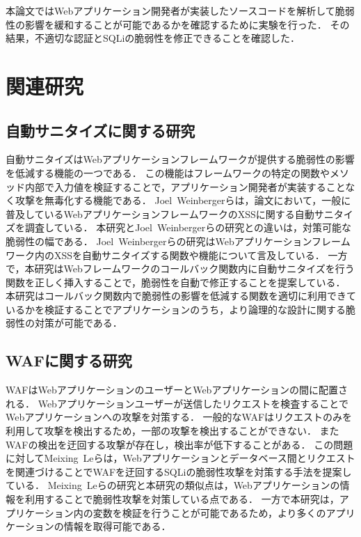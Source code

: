 \documentclass[a4paper,12pt]{jreport}
\begin{document}
本論文ではWebアプリケーション開発者が実装したソースコードを解析して脆弱性の影響を緩和することが可能であるかを確認するために実験を行った．
その結果，不適切な認証とSQLiの脆弱性を修正できることを確認した．

\chapter{関連研究}
\section{自動サニタイズに関する研究}
自動サニタイズはWebアプリケーションフレームワークが提供する脆弱性の影響を低減する機能の一つである．
この機能はフレームワークの特定の関数やメソッド内部で入力値を検証することで，アプリケーション開発者が実装することなく攻撃を無毒化する機能である．
Joel~Weinbergerらは，論文\cite{weinberger2011systematic}において，一般に普及しているWebアプリケーションフレームワークのXSSに関する自動サニタイズを調査している．
本研究とJoel~Weinbergerらの研究との違いは，対策可能な脆弱性の幅である．
Joel~Weinbergerらの研究はWebアプリケーションフレームワーク内のXSSを自動サニタイズする関数や機能について言及している．
一方で，本研究はWebフレームワークのコールバック関数内に自動サニタイズを行う関数を正しく挿入することで，脆弱性を自動で修正することを提案している．
本研究はコールバック関数内で脆弱性の影響を低減する関数を適切に利用できているかを検証することでアプリケーションのうち，より論理的な設計に関する脆弱性の対策が可能である．

\section{WAFに関する研究}
WAFはWebアプリケーションのユーザーとWebアプリケーションの間に配置される．
Webアプリケーションユーザーが送信したリクエストを検査することでWebアプリケーションへの攻撃を対策する．
一般的なWAFはリクエストのみを利用して攻撃を検出するため，一部の攻撃を検出することができない．
またWAFの検出を迂回する攻撃が存在し，検出率が低下することがある．
この問題に対してMeixing~Leらは，Webアプリケーションとデータベース間とリクエストを関連づけることでWAFを迂回するSQLiの脆弱性攻撃を対策する手法を提案している\cite{le2011doubleguard}．
Meixing~Leらの研究と本研究の類似点は，Webアプリケーションの情報を利用することで脆弱性攻撃を対策している点である．
一方で本研究は，アプリケーション内の変数を検証を行うことが可能であるため，より多くのアプリケーションの情報を取得可能である．
\end{document}

